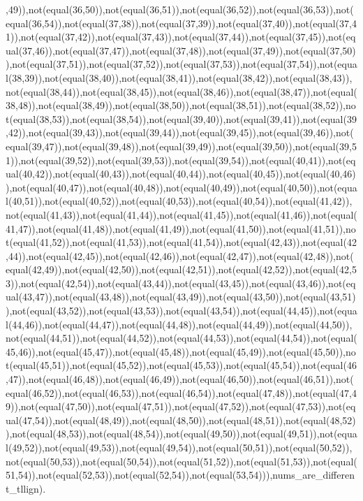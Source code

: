 ,49)),not(equal(36,50)),not(equal(36,51)),not(equal(36,52)),not(equal(36,53)),not(equal(36,54)),not(equal(37,38)),not(equal(37,39)),not(equal(37,40)),not(equal(37,41)),not(equal(37,42)),not(equal(37,43)),not(equal(37,44)),not(equal(37,45)),not(equal(37,46)),not(equal(37,47)),not(equal(37,48)),not(equal(37,49)),not(equal(37,50)),not(equal(37,51)),not(equal(37,52)),not(equal(37,53)),not(equal(37,54)),not(equal(38,39)),not(equal(38,40)),not(equal(38,41)),not(equal(38,42)),not(equal(38,43)),not(equal(38,44)),not(equal(38,45)),not(equal(38,46)),not(equal(38,47)),not(equal(38,48)),not(equal(38,49)),not(equal(38,50)),not(equal(38,51)),not(equal(38,52)),not(equal(38,53)),not(equal(38,54)),not(equal(39,40)),not(equal(39,41)),not(equal(39,42)),not(equal(39,43)),not(equal(39,44)),not(equal(39,45)),not(equal(39,46)),not(equal(39,47)),not(equal(39,48)),not(equal(39,49)),not(equal(39,50)),not(equal(39,51)),not(equal(39,52)),not(equal(39,53)),not(equal(39,54)),not(equal(40,41)),not(equal(40,42)),not(equal(40,43)),not(equal(40,44)),not(equal(40,45)),not(equal(40,46)),not(equal(40,47)),not(equal(40,48)),not(equal(40,49)),not(equal(40,50)),not(equal(40,51)),not(equal(40,52)),not(equal(40,53)),not(equal(40,54)),not(equal(41,42)),not(equal(41,43)),not(equal(41,44)),not(equal(41,45)),not(equal(41,46)),not(equal(41,47)),not(equal(41,48)),not(equal(41,49)),not(equal(41,50)),not(equal(41,51)),not(equal(41,52)),not(equal(41,53)),not(equal(41,54)),not(equal(42,43)),not(equal(42,44)),not(equal(42,45)),not(equal(42,46)),not(equal(42,47)),not(equal(42,48)),not(equal(42,49)),not(equal(42,50)),not(equal(42,51)),not(equal(42,52)),not(equal(42,53)),not(equal(42,54)),not(equal(43,44)),not(equal(43,45)),not(equal(43,46)),not(equal(43,47)),not(equal(43,48)),not(equal(43,49)),not(equal(43,50)),not(equal(43,51)),not(equal(43,52)),not(equal(43,53)),not(equal(43,54)),not(equal(44,45)),not(equal(44,46)),not(equal(44,47)),not(equal(44,48)),not(equal(44,49)),not(equal(44,50)),not(equal(44,51)),not(equal(44,52)),not(equal(44,53)),not(equal(44,54)),not(equal(45,46)),not(equal(45,47)),not(equal(45,48)),not(equal(45,49)),not(equal(45,50)),not(equal(45,51)),not(equal(45,52)),not(equal(45,53)),not(equal(45,54)),not(equal(46,47)),not(equal(46,48)),not(equal(46,49)),not(equal(46,50)),not(equal(46,51)),not(equal(46,52)),not(equal(46,53)),not(equal(46,54)),not(equal(47,48)),not(equal(47,49)),not(equal(47,50)),not(equal(47,51)),not(equal(47,52)),not(equal(47,53)),not(equal(47,54)),not(equal(48,49)),not(equal(48,50)),not(equal(48,51)),not(equal(48,52)),not(equal(48,53)),not(equal(48,54)),not(equal(49,50)),not(equal(49,51)),not(equal(49,52)),not(equal(49,53)),not(equal(49,54)),not(equal(50,51)),not(equal(50,52)),not(equal(50,53)),not(equal(50,54)),not(equal(51,52)),not(equal(51,53)),not(equal(51,54)),not(equal(52,53)),not(equal(52,54)),not(equal(53,54))),nums\_are\_different\_tllign).

